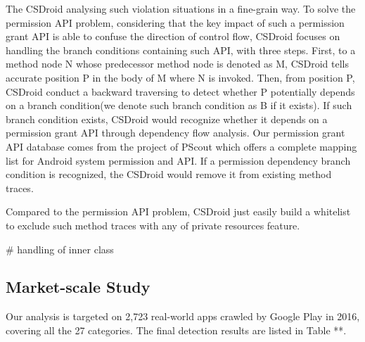 \documentclass{sig-alternate-05-2015}
\begin{document}
The CSDroid analysing such violation situations in a fine-grain way. To solve the permission API problem, considering that the key impact of such a permission grant API is able to confuse the direction of control flow, CSDroid focuses on handling the branch conditions containing such API, with three steps. First, to a method node N whose predecessor method node is denoted as M, CSDroid tells accurate position P in the body of M where N is invoked. Then, from position P, CSDroid conduct a backward traversing to detect whether P potentially depends on a branch condition(we denote such branch condition as B if it exists). If such branch condition exists, CSDroid would recognize whether it depends on a permission grant API through dependency flow analysis. Our permission grant API database comes from the project of PScout\cite{au2012pscout} which offers a complete mapping list for Android system permission and API. If a permission dependency branch condition is recognized, the CSDroid would remove it from existing method traces.

Compared to the permission API problem, CSDroid just easily build a whitelist to exclude such method traces with any of private resources feature.



\# handling of inner class  

\subsection{Market-scale Study}

Our analysis is targeted on 2,723 real-world apps crawled by Google Play in 2016, covering all the 27 categories. The final detection results are listed in Table **. 
\end{document}
